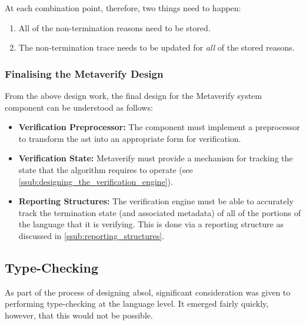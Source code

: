 At each combination point, therefore, two things need to happen:
\begin{enumerate}
    \item All of the non-termination reasons need to be stored.
    \item The non-termination trace needs to be updated for \textit{all} of the stored reasons. 
\end{enumerate}


\subsubsection{Finalising the Metaverify Design} %
\label{ssub:finalising_the_metaverify_design}
From the above design work, the final design for the Metaverify system component can be understood as follows:
\begin{itemize}
    \item \textbf{Verification Preprocessor:} The component must implement a preprocessor to transform the \gls{ast} into an appropriate form for verification.
    \item \textbf{Verification State:} Metaverify must provide a mechanism for tracking the state that the algorithm requires to operate (see \autoref{ssub:designing_the_verification_engine}).
    \item \textbf{Reporting Structures:} The verification engine must be able to accurately track the termination state (and associated metadata) of all of the portions of the language that it is verifying. 
    This is done via a reporting structure as discussed in \autoref{ssub:reporting_structures}.
\end{itemize}



\subsection{Type-Checking} %
\label{sub:type_checking}
As part of the process of designing \gls{absol}, significant consideration was given to performing type-checking at the language level. 
It emerged fairly quickly, however, that this would not be possible. \\

